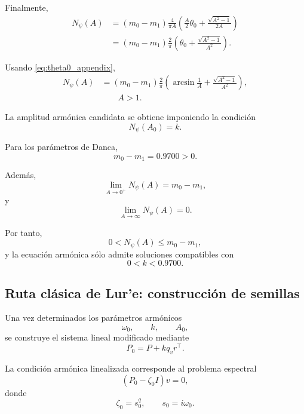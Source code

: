 \documentclass[journal]{IEEEtran}
\begin{document}
Finalmente,
\begin{align}
N_\psi(A)
&=
(m_0-m_1)
\frac{4}{\pi A}
\left(
\frac{A}{2}\theta_0
+
\frac{\sqrt{A^2-1}}{2A}
\right)
\\
&=
(m_0-m_1)
\frac{2}{\pi}
\left(
\theta_0
+
\frac{\sqrt{A^2-1}}{A^2}
\right).
\end{align}

Usando \eqref{eq:theta0_appendix},
\begin{equation}
\label{eq:Npsi_large_appendix}
\begin{aligned}
N_\psi(A)
&=
(m_0-m_1)
\frac{2}{\pi}
\left(
\arcsin\frac1A
+
\frac{\sqrt{A^2-1}}{A^2}
\right),\\
&\qquad A>1.
\end{aligned}
\end{equation}

La amplitud armónica candidata se obtiene imponiendo la condición
\begin{equation}
\label{eq:amp_ns}
N_\psi(A_0)=k.
\end{equation}

Para los parámetros de Danca,
\begin{equation}
m_0-m_1=0.9700>0.
\end{equation}

Además,
\begin{equation}
\lim_{A\to 0^+}N_\psi(A)=m_0-m_1,
\end{equation}
y
\begin{equation}
\lim_{A\to\infty}N_\psi(A)=0.
\end{equation}

Por tanto,
\begin{equation}
0<N_\psi(A)\leq m_0-m_1,
\end{equation}
y la ecuación armónica sólo admite soluciones compatibles con
\begin{equation}
0<k<0.9700.
\end{equation}
\subsection{Ruta clásica de Lur'e: construcción de semillas}

Una vez determinados los parámetros armónicos
\[
\omega_0,
\qquad
k,
\qquad
A_0,
\]
se construye el sistema lineal modificado mediante
\begin{equation}
\label{eq:P0_ns_appendix}
P_0=P+kq_vr^\top.
\end{equation}

La condición armónica linealizada corresponde al problema espectral
\begin{equation}
\label{eq:eig_problem_appendix}
(P_0-\zeta_0 I)v=0,
\end{equation}
donde
\begin{equation}
\label{eq:zeta0_def_appendix}
\zeta_0=s_0^q,
\qquad
s_0=i\omega_0.
\end{equation}
\end{document}
